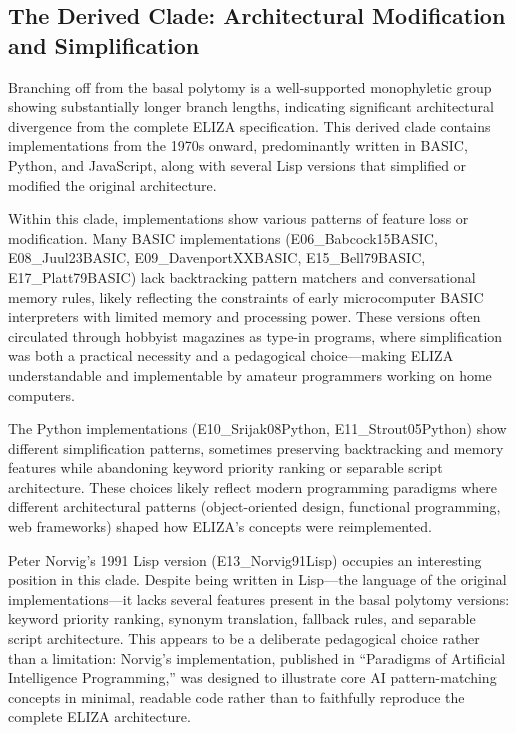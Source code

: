 \documentclass{article}
\begin{document}
\subsection{The Derived Clade: Architectural Modification and Simplification}

Branching off from the basal polytomy is a well-supported monophyletic group showing substantially longer branch lengths, indicating significant architectural divergence from the complete ELIZA specification. This derived clade contains implementations from the 1970s onward, predominantly written in BASIC, Python, and JavaScript, along with several Lisp versions that simplified or modified the original architecture.

Within this clade, implementations show various patterns of feature loss or modification. Many BASIC implementations (E06\_Babcock15BASIC, E08\_Juul23BASIC, E09\_DavenportXXBASIC, E15\_Bell79BASIC, E17\_Platt79BASIC) lack backtracking pattern matchers and conversational memory rules, likely reflecting the constraints of early microcomputer BASIC interpreters with limited memory and processing power. These versions often circulated through hobbyist magazines as type-in programs, where simplification was both a practical necessity and a pedagogical choice—making ELIZA understandable and implementable by amateur programmers working on home computers.

The Python implementations (E10\_Srijak08Python, E11\_Strout05Python) show different simplification patterns, sometimes preserving backtracking and memory features while abandoning keyword priority ranking or separable script architecture. These choices likely reflect modern programming paradigms where different architectural patterns (object-oriented design, functional programming, web frameworks) shaped how ELIZA's concepts were reimplemented.

Peter Norvig's 1991 Lisp version (E13\_Norvig91Lisp) occupies an interesting position in this clade. Despite being written in Lisp—the language of the original implementations—it lacks several features present in the basal polytomy versions: keyword priority ranking, synonym translation, fallback rules, and separable script architecture. This appears to be a deliberate pedagogical choice rather than a limitation: Norvig's implementation, published in ``Paradigms of Artificial Intelligence Programming,'' was designed to illustrate core AI pattern-matching concepts in minimal, readable code rather than to faithfully reproduce the complete ELIZA architecture.
\end{document}
